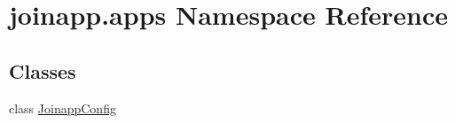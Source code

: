 \hypertarget{namespacejoinapp_1_1apps}{}\section{joinapp.\+apps Namespace Reference}
\label{namespacejoinapp_1_1apps}
\subsection*{Classes}
\begin{DoxyCompactItemize}
\item 
class \mbox{\hyperlink{classjoinapp_1_1apps_1_1_joinapp_config}{Joinapp\+Config}}
\end{DoxyCompactItemize}
